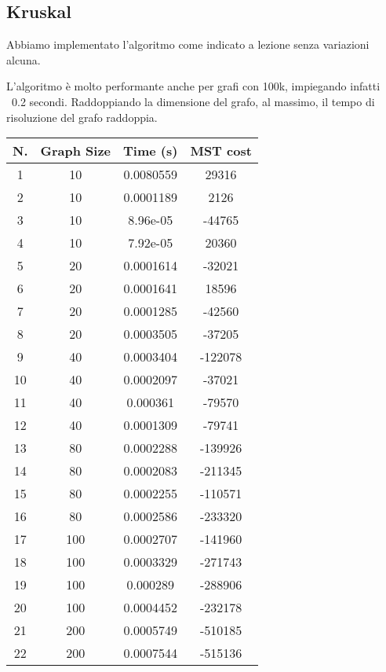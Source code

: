 \subsection{Kruskal}
Abbiamo implementato l'algoritmo come indicato a lezione senza variazioni alcuna.


L'algoritmo è molto performante anche per grafi con 100k, impiegando infatti ~0.2 secondi. Raddoppiando la dimensione del grafo, al massimo, il tempo di risoluzione del grafo raddoppia. 

\begin{table}[H]
	\centering
	\begin{tabular}{|c|c|c|c|}
		\hline
		\textbf{N.} & \textbf{Graph Size} & \textbf{Time (s)} & \textbf{MST cost}\\ 
		\hline
		1 & 10 & 0.0080559 & 29316\\
		\hline
		2 & 10 & 0.0001189 & 2126\\
		\hline
		3 & 10 & 8.96e-05 & -44765\\
		\hline
		4 & 10 & 7.92e-05 & 20360\\
		\hline\hline
		5 & 20 & 0.0001614 & -32021\\
		\hline
		6 & 20 & 0.0001641 & 18596\\
		\hline
		7 & 20 & 0.0001285 & -42560\\
		\hline
		8 & 20 & 0.0003505 & -37205\\
		\hline\hline
		9 & 40 & 0.0003404 & -122078\\
		\hline
		10 & 40 & 0.0002097 & -37021\\
		\hline
		11 & 40 & 0.000361 & -79570\\
		\hline
		12 & 40 & 0.0001309 & -79741\\
		\hline\hline
		13 & 80 & 0.0002288 & -139926\\
		\hline
		14 & 80 & 0.0002083 & -211345\\
		\hline
		15 & 80 & 0.0002255 & -110571\\
		\hline
		16 & 80 & 0.0002586 & -233320\\
		\hline\hline
		17 & 100 & 0.0002707 & -141960\\
		\hline
		18 & 100 & 0.0003329 & -271743\\
		\hline
		19 & 100 & 0.000289 & -288906\\
		\hline
		20 & 100 & 0.0004452 & -232178\\
		\hline\hline
		21 & 200 & 0.0005749 & -510185\\
		\hline
		22 & 200 & 0.0007544 & -515136\\

\end{tabular}
\end{table}
